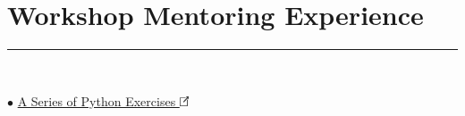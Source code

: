 \documentclass[]{rahulworld-resume}
\begin{document}
\section{Workshop Mentoring Experience}
\vspace{-5pt}\noindent\rule{\textwidth}{0.4pt}\vspace{4pt}\\
\begin{minipage}{0.16\textwidth} %
	\begin{minipage}{0.52\textwidth}
	\end{minipage}
	\begin{minipage}{0.42\textwidth}
	\end{minipage}
\end{minipage}
\hfill
\begin{minipage}{0.83\textwidth\vspace{5pt}}
	\vspace{-3pt}
	\normalfont\normalsize
	$\bullet$ \href{https://github.com/BehzadShayegh/PythonTutorialExercises}{A Series of Python Exercises \includegraphics[width=8pt]{icons/redirect.png}}
\end{minipage}\\
\begin{minipage}{0.16\textwidth} %
	\begin{minipage}{0.52\textwidth}
	\end{minipage}
	\begin{minipage}{0.42\textwidth}
	\end{minipage}
\end{minipage}
\hfill
\begin{minipage}{0.83\textwidth\vspace{5pt}}
\end{minipage}\\
\begin{minipage}{0.16\textwidth} %
	\begin{minipage}{0.52\textwidth}
	\end{minipage}
	\begin{minipage}{0.42\textwidth}
	\end{minipage}
\end{minipage}
\end{document}

